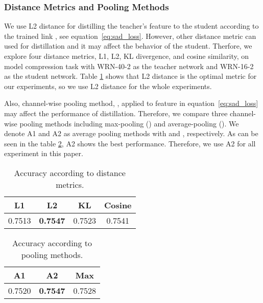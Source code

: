 \subsubsection{Distance Metrics and Pooling Methods}
We use L2 distance for distilling the teacher's feature to the student according to the trained link , see equation~\ref{eq:sad_loss}. However, other distance metric can used for distillation \cite{nst,vid,atts} and it may affect the behavior of the student. Therfore, we explore four distance metrics, L1, L2, KL divergence, and cosine similarity, on model compression task with WRN-40-2 as the teacher network and WRN-16-2 as the student network. Table \ref{table:distance_metric} shows that L2 distance is the optimal metric for our experiments, so we use L2 distance for the whole experiments.

Also, channel-wise pooling method, , applied to feature in equation~\ref{eq:sad_loss} may affect the performance of distillation. Therefore, we compare three channel-wise pooling methods including max-pooling () and average-pooling (). We denote A1 and A2 as average pooling methods with  and , respectively. As can be seen in the table \ref{table:pooling}, A2 shows the best performance. Therefore, we use A2 for all experiment in this paper.

\begin{table}[h]
\centering
\begin{tabular}{cccc}
\toprule
L1     & L2              & KL     & Cosine \\ \midrule
0.7513 & \textbf{0.7547} & 0.7523 & 0.7541 \\ \bottomrule
\end{tabular}
\caption{Accuracy according to distance metrics.}
\label{table:distance_metric}
\end{table}
\vspace{-1em}

\begin{table}[h]
\centering
\begin{tabular}{ccc}
\toprule
A1     & A2              & Max      \\ \midrule
0.7520 & \textbf{0.7547} & 0.7528  \\ \bottomrule
\end{tabular}
\caption{Accuracy according to pooling methods.}
\label{table:pooling}
\end{table}
